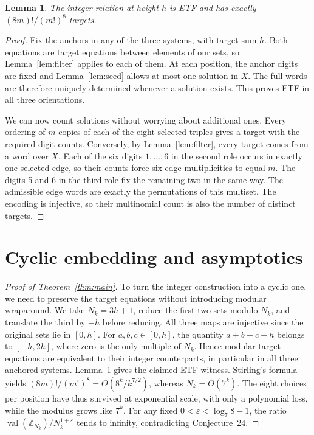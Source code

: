 \documentclass[11pt,a4paper]{article}
\newtheorem{lemma}{Lemma}
\newcommand{\val}{\operatorname{val}}
\newcommand{\Z}{\mathbb Z}
\begin{document}
\begin{lemma}\label{lem:count}
The integer relation at height $h$ is ETF and has exactly $(8m)!/(m!)^8$ targets.
\end{lemma}
\begin{proof}
Fix the anchors in any of the three systems, with target sum $h$. Both equations are target equations between elements of our sets, so Lemma~\ref{lem:filter} applies to each of them. At each position, the anchor digits are fixed and Lemma~\ref{lem:seed} allows at most one solution in $X$. The full words are therefore uniquely determined whenever a solution exists. This proves ETF in all three orientations.

We can now count solutions without worrying about additional ones. Every ordering of $m$ copies of each of the eight selected triples gives a target with the required digit counts. Conversely, by Lemma~\ref{lem:filter}, every target comes from a word over $X$. Each of the six digits $1,\ldots,6$ in the second role occurs in exactly one selected edge, so their counts force six edge multiplicities to equal $m$. The digits 5 and 6 in the third role fix the remaining two in the same way. The admissible edge words are exactly the permutations of this multiset. The encoding is injective, so their multinomial count is also the number of distinct targets.
\end{proof}
\section{Cyclic embedding and asymptotics}
\begin{proof}[Proof of Theorem~\ref{thm:main}]
To turn the integer construction into a cyclic one, we need to preserve the target equations without introducing modular wraparound. We take $N_k=3h+1$, reduce the first two sets modulo $N_k$, and translate the third by $-h$ before reducing. All three maps are injective since the original sets lie in $[0,h]$. For $a,b,c\in[0,h]$, the quantity $a+b+c-h$ belongs to $[-h,2h]$, where zero is the only multiple of $N_k$. Hence modular target equations are equivalent to their integer counterparts, in particular in all three anchored systems. Lemma~\ref{lem:count} gives the claimed ETF witness. Stirling's formula yields $(8m)!/(m!)^8=\Theta(8^k/k^{7/2})$, whereas $N_k=\Theta(7^k)$. The eight choices per position have thus survived at exponential scale, with only a polynomial loss, while the modulus grows like $7^k$. For any fixed $0<\varepsilon<\log_7 8-1$, the ratio $\val(\Z_{N_k})/N_k^{1+\varepsilon}$ tends to infinity, contradicting Conjecture~24.
\end{proof}
\end{document}
